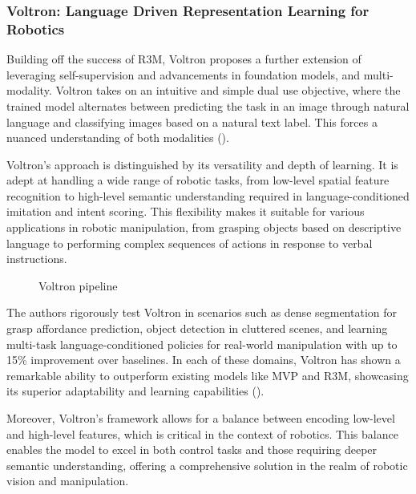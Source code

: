 \documentclass[
  letterpaper,
  numbers=noenddot,
  DIV=11]{scrreprt}
\theoremstyle{plain}
\theoremstyle{definition}
\theoremstyle{plain}
\theoremstyle{remark}
\begin{document}
\subsubsection*{Voltron: Language Driven Representation Learning for
Robotics}\label{voltron-language-driven-representation-learning-for-robotics}

Building off the success of R3M, Voltron proposes a further extension of
leveraging self-supervision and advancements in foundation models, and
multi-modality. Voltron takes on an intuitive and simple dual use
objective, where the trained model alternates between predicting the
task in an image through natural language and classifying images based
on a natural text label. This forces a nuanced understanding of both
modalities ().

Voltron's approach is distinguished by its versatility and depth of
learning. It is adept at handling a wide range of robotic tasks, from
low-level spatial feature recognition to high-level semantic
understanding required in language-conditioned imitation and intent
scoring. This flexibility makes it suitable for various applications in
robotic manipulation, from grasping objects based on descriptive
language to performing complex sequences of actions in response to
verbal instructions.

\begin{figure}


\caption{\label{fig-voltron-pipeline}Voltron pipeline}

\end{figure}%

The authors rigorously test Voltron in scenarios such as dense
segmentation for grasp affordance prediction, object detection in
cluttered scenes, and learning multi-task language-conditioned policies
for real-world manipulation with up to 15\% improvement over baselines.
In each of these domains, Voltron has shown a remarkable ability to
outperform existing models like MVP and R3M, showcasing its superior
adaptability and learning capabilities
().

Moreover, Voltron's framework allows for a balance between encoding
low-level and high-level features, which is critical in the context of
robotics. This balance enables the model to excel in both control tasks
and those requiring deeper semantic understanding, offering a
comprehensive solution in the realm of robotic vision and manipulation.
\end{document}
